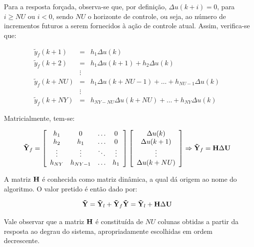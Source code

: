 Para a resposta forçada, observa-se que, por definição, $\Delta u(k+i) = 0$,
para $i \geq NU$ ou $i < 0$, sendo $NU$ o horizonte de controle, ou seja, ao
número de incrementos futuros a serem fornecidos à ação de controle atual.
Assim, verifica-se que:

\begin{eqnarray}
\tilde{y}_f(k+1)  & = & h_1\Delta u(k)\nonumber\\
\tilde{y}_f(k+2)  & = & h_1\Delta u(k+1) + h_2\Delta u(k)\nonumber\\
& \vdots & \nonumber\\
\tilde{y}_f(k+NU) & = & h_1\Delta u(k+NU-1) + \ldots + 
                        h_{NU-1}\Delta u(k)\nonumber\\
& \vdots & \nonumber\\
\tilde{y}_f(k+NY) & = & h_{NY-NU}\Delta u(k+NU) + \ldots + 
                        h_{NY}\Delta u(k)\nonumber
\end{eqnarray}

Matricialmente, tem-se:

\begin{equation}\label{eq:resp_forc_mat}
\mathbf{\tilde{Y}}_f = 
\left[
    \begin{array}{cccc}
        h_1 & 0 & \ldots & 0\\
        h_2 & h_1 & \ldots & 0\\
        \vdots & \vdots & \ddots & \vdots\\
        h_{NY} & h_{NY-1} & \ldots & h_1
    \end{array}
\right]
\left[
    \begin{array}{c}
        \Delta u(k)\\
        \Delta u(k+1)\\
        \vdots\\
        \Delta u(k+NU)\\
    \end{array}
\right]
\Rightarrow \mathbf{\tilde{Y}}_f = \mathbf{H}\Delta\mathbf{U}
\end{equation}

A matriz $\mathbf{H}$ é conhecida como matriz dinâmica, a qual dá origem ao nome do
algoritmo. O valor pretido é então dado por:

\begin{equation}\label{eq:y_pred_mat}
\mathbf{\tilde{Y}} = \mathbf{\tilde{Y}}_l + \mathbf{\tilde{Y}}_f
\mathbf{\tilde{Y}} = \mathbf{\tilde{Y}}_l + \mathbf{H}\Delta\mathbf{U}
\end{equation}

Vale observar que a matriz $\mathbf{H}$ é constituída de $NU$ colunas obtidas a
partir da resposta ao degrau do sistema, apropriadamente escolhidas em ordem
decrescente.


